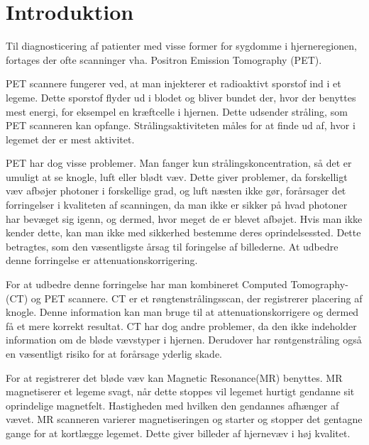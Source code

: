 \section{Introduktion}


Til diagnosticering af patienter med visse former for sygdomme i hjerneregionen, fortages der ofte scanninger vha. Positron Emission Tomography (PET). 

PET scannere fungerer ved, at man injekterer et radioaktivt sporstof
ind i et legeme. Dette sporstof flyder ud i blodet og bliver bundet
der, hvor der benyttes mest energi, for eksempel en kræftcelle i
hjernen. Dette udsender stråling, som PET scanneren kan opfange.
Strålingsaktiviteten måles for at finde ud af, hvor i legemet der er
mest aktivitet.


PET har dog visse problemer. Man fanger kun strålingskoncentration,
så det er umuligt at se knogle, luft eller blødt væv. Dette giver
problemer, da forskelligt væv afbøjer photoner i forskellige grad,
og luft næsten ikke gør, forårsager det forringelser i kvaliteten
af scanningen, da man ikke er sikker på hvad photoner har bevæget
sig igenn, og dermed, hvor meget de er blevet afbøjet. Hvis man ikke
kender dette, kan man ikke med sikkerhed bestemme deres oprindelsessted.
Dette betragtes, som den væsentligste årsag til foringelse af
billederne.\cite{vigtighedAfAttenuation} At udbedre denne forringelse er
attenuationskorrigering.

For at udbedre denne forringelse har man kombineret Computed
Tomo\-graphy- (CT) og PET scannere. CT er et røngtenstrålingsscan,
der registrerer placering af knogle. Denne information kan man bruge
til at attenuationskorrigere og dermed få et mere korrekt resultat.
CT har dog andre problemer, da den ikke indeholder information om de
bløde vævstyper i hjernen. Derudover har røntgenstråling også
en væsentligt risiko for at forårsage yderlig skade. \cite{skadeligCT}

For at registrerer det bløde væv kan Magnetic Resonance(MR) benyttes.
MR magnetiserer et legeme svagt, når dette stoppes vil legemet hurtigt
gendanne sit oprindelige magnetfelt. Hastigheden med hvilken den gendannes
afhænger af vævet. MR scanneren varierer magnetiseringen og starter og
stopper det gentagne gange for at kortlægge legemet. Dette giver billeder
af hjernevæv i høj kvalitet.

